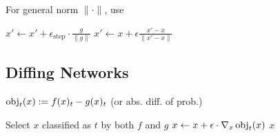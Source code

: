 For general norm $\|\cdot\|$, use
\begin{algorithmic}
\State $x' \gets x' + \epsilon_\text{step} \cdot \frac{g}{\|g\|}$ 
 \State $x' \gets x + \epsilon \frac{x'-x}{\|x'-x\|}$ \EndIf
\end{algorithmic}

\subsection*{Diffing Networks}
$\operatorname{obj}_t(x) := f(x)_t - g(x)_t$ (or abs. diff. of prob.)

\begin{algorithmic}
\State Select $x$ classified as $t$ by both $f$ and $g$
    \State $x \gets x + \epsilon \cdot \nabla_x \operatorname{obj}_t(x)$ 
\EndWhile
\State \Return $x$
\EndFunction
\end{algorithmic}